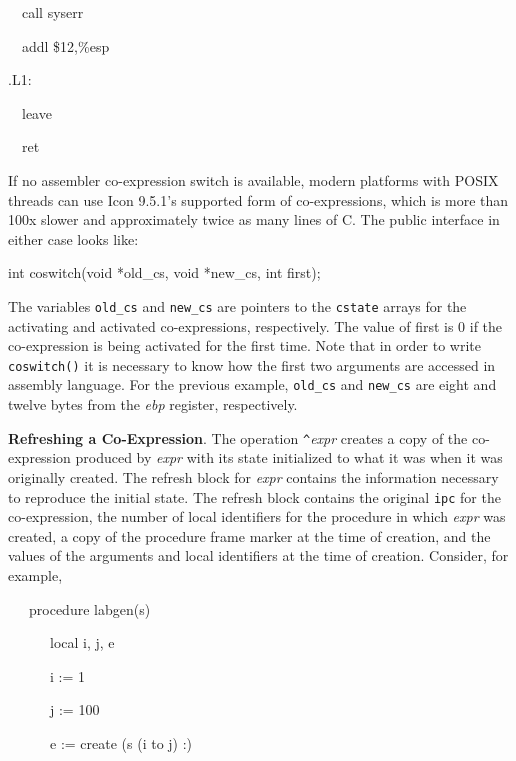{\ttfamily\mdseries
\ \ call syserr}

{\ttfamily\mdseries
\ \ addl \$12,\%esp}


\bigskip

{\ttfamily\mdseries
.L1:}

{\ttfamily\mdseries
\ \ leave}

{\ttfamily\mdseries
\ \ ret}


If no assembler co-expression switch is available, modern platforms
with POSIX threads can use Icon 9.5.1's supported form of
co-expressions, which is more than 100x slower and approximately twice
as many lines of C. The public interface in either case looks like:

{\ttfamily\mdseries
int coswitch(void *old\_cs, void *new\_cs, int first);}


The variables \texttt{old\_cs} and \texttt{new\_cs} are pointers to
the \texttt{cstate} arrays for the activating and activated
co-expressions, respectively. The value of first is 0 if the
co-expression is being activated for the first time. Note that in
order to write \texttt{coswitch()} it is necessary to know how the
first two arguments are accessed in assembly language. For the
previous example, \texttt{old\_cs} and \texttt{new\_cs} are eight and
twelve bytes from the \textit{ebp }register, respectively.


\textbf{Refreshing a Co-Expression}. The operation
\texttt{\textit{\^{}}}\textit{expr} creates a copy of
the co-expression produced by \textit{expr} with its
state initialized to what it was when it was originally created. The
refresh block for \textit{expr} contains the
information necessary to reproduce the initial state. The refresh
block contains the original \texttt{ipc} for the co-expression, the
number of local identifiers for the procedure in which
\textit{expr} was created, a copy of the procedure
frame marker at the time of creation, and the values of the arguments
and local identifiers at the time of creation. Consider, for example,

{\ttfamily\mdseries
\ \ \ procedure labgen(s)}

{\ttfamily\mdseries
\ \ \ \ \ \ local i, j, e}

{\ttfamily\mdseries
\ \ \ \ \ \ i := 1}

{\ttfamily\mdseries
\ \ \ \ \ \ j := 100}

{\ttfamily\mdseries
\ \ \ \ \ \ e := create (s {\textbar}{\textbar} (i to j) {\textbar}{\textbar} {\textquotedbl}:{\textquotedbl})}

